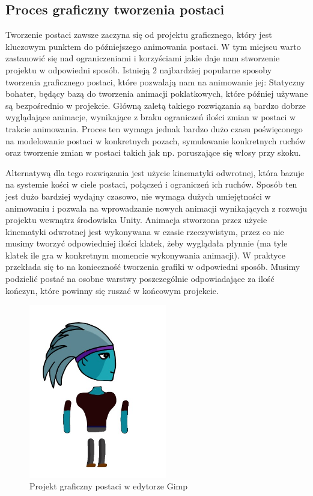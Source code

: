 \documentclass[oneside,polski,logo]{amuthesis}
\begin{document}
\subsection{Proces graficzny tworzenia postaci}
Tworzenie postaci zawsze zaczyna się od projektu graficznego, który jest kluczowym punktem do późniejszego animowania postaci. W tym miejscu warto zastanowić się nad ograniczeniami i korzyściami jakie daje nam stworzenie projektu w odpowiedni sposób. Istnieją 2 najbardziej popularne sposoby tworzenia graficznego postaci, które pozwalają nam na animowanie jej:
Statyczny bohater, będący bazą do tworzenia animacji poklatkowych, które później używane są bezpośrednio w projekcie. Główną zaletą takiego rozwiązania są bardzo dobrze wyglądające animacje, wynikające z braku ograniczeń ilości zmian w postaci w trakcie animowania.
Proces ten wymaga jednak bardzo dużo czasu poświęconego na modelowanie postaci w konkretnych pozach, symulowanie konkretnych ruchów oraz tworzenie zmian w postaci takich jak np. poruszające się włosy przy skoku.

Alternatywą dla tego rozwiązania jest użycie kinematyki odwrotnej, która bazuje na systemie kości w ciele postaci, połączeń i ograniczeń ich ruchów. Sposób ten jest dużo bardziej wydajny czasowo, nie wymaga dużych umiejętności w animowaniu i pozwala na wprowadzanie nowych animacji wynikających z rozwoju projektu wewnątrz środowiska Unity. Animacja stworzona przez użycie kinematyki odwrotnej jest wykonywana w czasie rzeczywistym, przez co nie musimy tworzyć odpowiedniej ilości klatek, żeby wyglądała płynnie (ma tyle klatek ile gra w konkretnym momencie wykonywania animacji).
W praktyce przekłada się to na konieczność tworzenia grafiki w odpowiedni sposób. Musimy podzielić postać na osobne warstwy poszczególnie odpowiadające za ilość kończyn, które powinny się ruszać w końcowym projekcie.\\

\begin{figure}[h]
	\centering
	\includegraphics[width=6cm]{images/kozubal/separatedCharacter.jpg}
	\caption{Projekt graficzny postaci w edytorze Gimp}
\end{figure}
\end{document}
